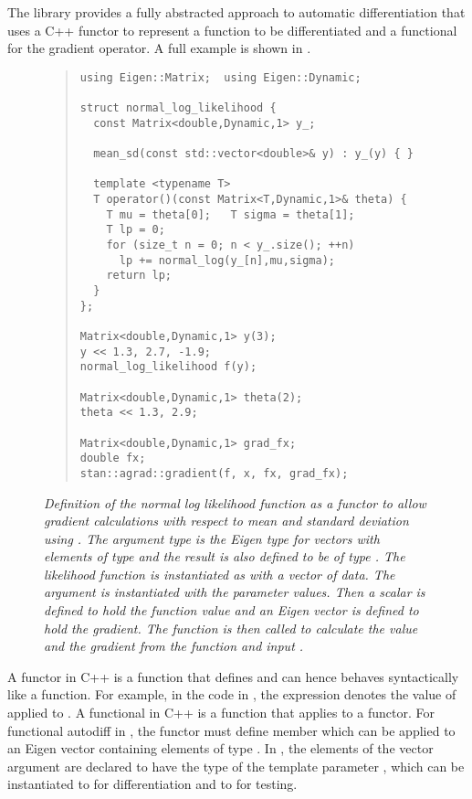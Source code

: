 \documentclass[10pt]{article}
\begin{document}
The  library provides a fully abstracted approach to
automatic differentiation that uses a C++ functor to represent a
function to be differentiated and a functional for the gradient
operator.  A full example is shown in .
%
\begin{figure}
\begin{quote}\small
\begin{Verbatim}
using Eigen::Matrix;  using Eigen::Dynamic;

struct normal_log_likelihood {
  const Matrix<double,Dynamic,1> y_;

  mean_sd(const std::vector<double>& y) : y_(y) { }

  template <typename T>
  T operator()(const Matrix<T,Dynamic,1>& theta) {
    T mu = theta[0];   T sigma = theta[1];
    T lp = 0;
    for (size_t n = 0; n < y_.size(); ++n)
      lp += normal_log(y_[n],mu,sigma);
    return lp;
  }
};

Matrix<double,Dynamic,1> y(3);
y << 1.3, 2.7, -1.9;
normal_log_likelihood f(y);

Matrix<double,Dynamic,1> theta(2);
theta << 1.3, 2.9;

Matrix<double,Dynamic,1> grad_fx;
double fx;
stan::agrad::gradient(f, x, fx, grad_fx);
\end{Verbatim}
\end{quote}
\caption{\small\it Definition of the normal log likelihood function as
  a functor to allow gradient calculations with respect to mean and
  standard deviation using .  The argument type is
  the Eigen type for vectors with elements of type  and the
  result is also defined to be of type .  The likelihood
  function is instantiated as  with a vector of data.  The
  argument  is instantiated with the parameter values.
  Then a scalar  is defined to hold the function value and an
  Eigen vector  is defined to hold the gradient.  The
  function  is then called to calculate the value and
  the gradient from the function  and input
  .}\label{normal-functor.figure}
\end{figure}
%

A functor in C++ is a function that defines  and can
hence behaves syntactically like a function.  For example, in the code
in , the expression  denotes the
value of  applied to .  A functional in C++ is a
function that applies to a functor.  For functional autodiff in
, the functor must define  member
which can be applied to an Eigen vector containing elements of type
.  In , the elements of the
vector argument are declared to have the type of the template
parameter , which can be instantiated to  for
differentiation and to  for testing.
\end{document}

